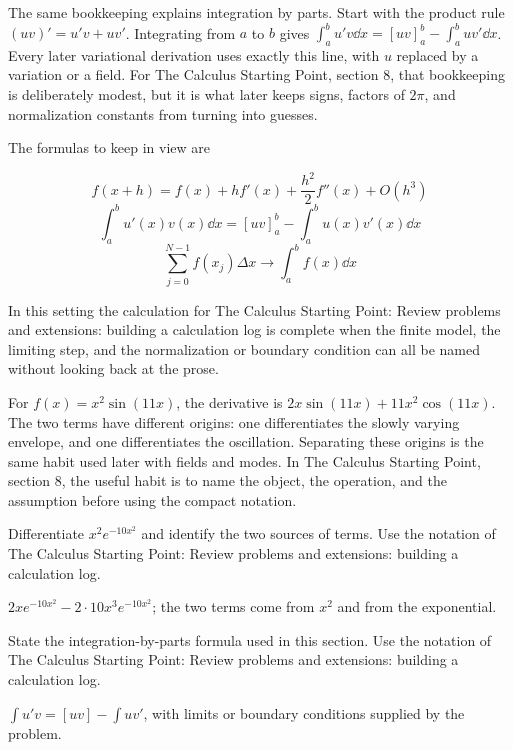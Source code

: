 The same bookkeeping explains integration by parts.  Start with the product rule \((uv)'=u'v+uv'\).  Integrating from \(a\) to \(b\) gives \(\int_a^b u'v\dd x=[uv]_a^b-\int_a^buv'\dd x\).  Every later variational derivation uses exactly this line, with \(u\) replaced by a variation or a field.  For The Calculus Starting Point, section 8, that bookkeeping is deliberately modest, but it is what later keeps signs, factors of \(2\pi\), and normalization constants from turning into guesses.

The formulas to keep in view are

\[
  f(x+h)=f(x)+hf'(x)+\frac{h^2}{2}f''(x)+O(h^3)
\]
\[
  \int_a^b u'(x)v(x)\dd x=[uv]_a^b-\int_a^b u(x)v'(x)\dd x
\]
\[
  \sum_{j=0}^{N-1}f(x_j)\Delta x\longrightarrow \int_a^b f(x)\dd x
\]

In this setting the calculation for The Calculus Starting Point: Review problems and extensions: building a calculation log is complete when the finite model, the limiting step, and the normalization or boundary condition can all be named without looking back at the prose.




\begin{example}
For \(f(x)=x^2\sin(11x)\), the derivative is \(2x\sin(11x)+11x^2\cos(11x)\).  The two terms have different origins: one differentiates the slowly varying envelope, and one differentiates the oscillation.  Separating these origins is the same habit used later with fields and modes.  In The Calculus Starting Point, section 8, the useful habit is to name the object, the operation, and the assumption before using the compact notation.
\end{example}



\begin{exercise}
Differentiate \(x^2e^{-10x^2}\) and identify the two sources of terms.  Use the notation of The Calculus Starting Point: Review problems and extensions: building a calculation log.
\begin{answer}
\(2xe^{-10x^2}-2\cdot 10x^3e^{-10x^2}\); the two terms come from \(x^2\) and from the exponential.
\end{answer}
\end{exercise}

\begin{exercise}
State the integration-by-parts formula used in this section.  Use the notation of The Calculus Starting Point: Review problems and extensions: building a calculation log.
\begin{answer}
\(\int u'v=[uv]-\int uv'\), with limits or boundary conditions supplied by the problem.
\end{answer}
\end{exercise}



